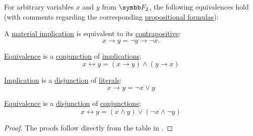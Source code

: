 \begin{proposition}\label{thm:boolean_function_equivalences}
  For arbitrary variables \( x \) and \( y \) from \( \BF_2 \), the following equivalences hold (with comments regarding the corresponding \hyperref[def:propositional_language/formula]{propositional formulas}):

  \begin{PropEnum}
     A \hyperref[def:material_implication]{material implication} is equivalent to its \hyperref[def:material_implication/contrapositive]{contrapositive}:
    \begin{equation}\label{eq:thm:boolean_equivalences/contrapositive}
      x \rightarrow y = \neg y \rightarrow \neg x.
    \end{equation}

     \hyperref[def:propositional_alphabet/connectives/equivalence]{Equivalence} is a \hyperref[def:propositional_alphabet/connectives/conjunction]{conjunction} of \hyperref[def:material_implication]{implications}:
    \begin{equation}\label{eq:thm:boolean_equivalences/equivalence_via_implication}
      x \leftrightarrow y = (x \rightarrow y) \wedge (y \rightarrow x)
    \end{equation}

     \hyperref[def:propositional_alphabet/connectives/implication]{Implication} is a \hyperref[def:propositional_alphabet/connectives/disjunction]{disjunction} of \hyperref[def:conjunctive_disjunctive_normal_form/literal]{literals}:
    \begin{equation}\label{eq:thm:boolean_equivalences/equivalence_cnf}
      x \rightarrow y = \neg x \vee y
    \end{equation}

     \hyperref[def:propositional_alphabet/connectives/equivalence]{Equivalence} is a \hyperref[def:propositional_alphabet/connectives/disjunction]{disjunction} of \hyperref[def:propositional_alphabet/connectives/conjunction]{conjunctions}:
    \begin{equation}\label{eq:thm:boolean_equivalences/equivalence_dnf}
      x \leftrightarrow y = (x \wedge y) \vee (\neg x \wedge \neg y)
    \end{equation}
  \end{PropEnum}
\end{proposition}
\begin{proof}
  The proofs follow directly from the table in .
\end{proof}

